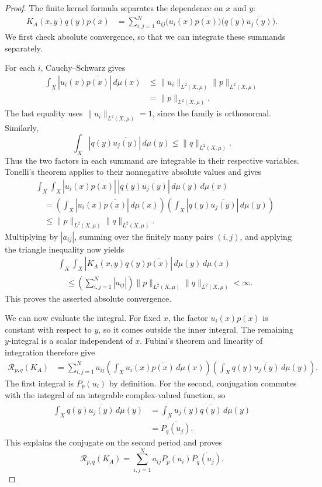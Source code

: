 \begin{proof}
The finite kernel formula separates the dependence on $x$ and $y$:
\[
\begin{aligned}
K_A(x,y)q(y)\overline{p(x)}
&=\sum_{i,j=1}^N a_{ij}
\bigl(u_i(x)\overline{p(x)}\bigr)
\bigl(q(y)\overline{u_j(y)}\bigr).
\end{aligned}
\]
We first check absolute convergence, so that we can integrate these summands separately.

For each $i$, Cauchy--Schwarz gives
\[
\begin{aligned}
\int_X|u_i(x)\overline{p(x)}|\,d\mu(x)
&\leq \|u_i\|_{L^2(X,\mu)}\|p\|_{L^2(X,\mu)}\\
&=\|p\|_{L^2(X,\mu)}.
\end{aligned}
\]
The last equality uses $\|u_i\|_{L^2(X,\mu)}=1$, since the family is orthonormal. Similarly,
\[
\int_X|q(y)\overline{u_j(y)}|\,d\mu(y)
\leq \|q\|_{L^2(X,\mu)}.
\]
Thus the two factors in each summand are integrable in their respective variables. Tonelli's theorem applies to their nonnegative absolute values and gives
\[
\begin{aligned}
&\int_X\int_X
|u_i(x)\overline{p(x)}|\,|q(y)\overline{u_j(y)}|
\,d\mu(y)\,d\mu(x)\\
&\quad=\left(\int_X|u_i(x)\overline{p(x)}|\,d\mu(x)\right)
\left(\int_X|q(y)\overline{u_j(y)}|\,d\mu(y)\right)\\
&\quad\leq \|p\|_{L^2(X,\mu)}\|q\|_{L^2(X,\mu)}.
\end{aligned}
\]
Multiplying by $|a_{ij}|$, summing over the finitely many pairs $(i,j)$, and applying the triangle inequality now yields
\[
\begin{aligned}
&\int_X\int_X|K_A(x,y)q(y)\overline{p(x)}|
\,d\mu(y)\,d\mu(x)\\
&\quad\leq\left(\sum_{i,j=1}^N|a_{ij}|\right)
\|p\|_{L^2(X,\mu)}\|q\|_{L^2(X,\mu)}<\infty.
\end{aligned}
\]
This proves the asserted absolute convergence.

We can now evaluate the integral. For fixed $x$, the factor $u_i(x)\overline{p(x)}$ is constant with respect to $y$, so it comes outside the inner integral. The remaining $y$-integral is a scalar independent of $x$. Fubini's theorem and linearity of integration therefore give
\[
\begin{aligned}
\mathcal R_{p,q}(K_A)
&=\sum_{i,j=1}^N a_{ij}
\left(\int_X u_i(x)\overline{p(x)}\,d\mu(x)\right)
\left(\int_X q(y)\overline{u_j(y)}\,d\mu(y)\right).
\end{aligned}
\]
The first integral is $P_p(u_i)$ by definition. For the second, conjugation commutes with the integral of an integrable complex-valued function, so
\[
\begin{aligned}
\int_X q(y)\overline{u_j(y)}\,d\mu(y)
&=\overline{\int_X u_j(y)\overline{q(y)}\,d\mu(y)}\\
&=\overline{P_q(u_j)}.
\end{aligned}
\]
This explains the conjugate on the second period and proves
\[
\mathcal R_{p,q}(K_A)
=\sum_{i,j=1}^N a_{ij}P_p(u_i)\overline{P_q(u_j)}.
\]


\end{proof}
